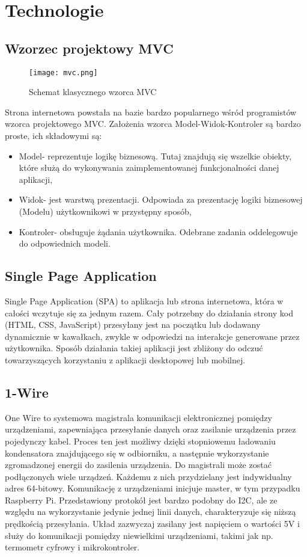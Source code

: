 \section{Technologie}
\subsection{Wzorzec projektowy MVC}
\begin{figure}[H]
	\centering
	\texttt{[image: mvc.png]}
	\caption{Schemat klasycznego wzorca MVC}
	\label{fig:schemat_mvc}
\end{figure}
Strona internetowa powstała na bazie bardzo popularnego wśród programistów wzorca projektowego MVC. Założenia wzorca Model-Widok-Kontroler są bardzo proste, ich składowymi są:
\begin{itemize}
\item Model- reprezentuje logikę biznesową. Tutaj znajdują się wszelkie obiekty, które służą do wykonywania zaimplementowanej funkcjonalności danej aplikacji,
\item Widok- jest warstwą prezentacji. Odpowiada za prezentację logiki biznesowej (Modelu) użytkownikowi w przystępny sposób,
\item Kontroler- obsługuje żądania użytkownika. Odebrane zadania oddelegowuje do odpowiednich modeli.
\end{itemize}

\subsection{Single Page Application}
Single Page Application (SPA) to aplikacja lub strona internetowa, która w całości wczytuje się za jednym razem. Cały potrzebny do działania strony kod (HTML, CSS, JavaScript) przesyłany jest na początku lub dodawany dynamicznie w kawałkach, zwykle w odpowiedzi na interakcje generowane przez użytkownika.
Sposób działania takiej aplikacji jest zbliżony do odczuć towarzyszących korzystaniu z aplikacji desktopowej lub mobilnej.

\subsection{1-Wire} \label{1wire}
One Wire to systemowa magistrala komunikacji elektronicznej pomiędzy urządzeniami, zapewniająca przesyłanie danych oraz zasilanie urządzenia przez pojedynczy kabel. Proces ten jest możliwy dzięki stopniowemu ładowaniu kondensatora znajdującego się w odbiorniku, a następnie wykorzystanie zgromadzonej energii do zasilenia urządzenia. Do magistrali może zostać podłączonych wiele urządzeń. Każdemu z nich przydzielany jest indywidualny adres 64-bitowy. Komunikację z urządzeniami inicjuje master, w tym przypadku Raspberry Pi.
Przedstawiony protokół jest bardzo podobny do I2C, ale ze względu na wykorzystanie jedynie jednej linii danych, charakteryzuje się niższą prędkością przesyłania. Układ zazwyczaj zasilany jest napięciem o wartości 5V i służy do komunikacji pomiędzy niewielkimi urządzeniami, takimi jak np. termometr cyfrowy i mikrokontroler.

